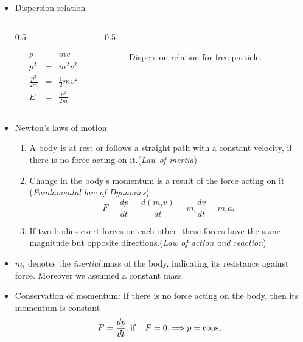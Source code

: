 \documentclass[t,aspectratio=169]{beamer}
\begin{document}
\begin{frame}
\begin{itemize}
\item Dispersion relation
\begin{columns}
\begin{column}{0.5\textwidth}
\begin{center}    
\begin{eqnarray*}
p&=&mv \\
p^{2}&=&m^{2}v^{2} \\
\frac{p^{2}}{2m}&=&\frac{1}{2}mv^{2} \\
E&=&\frac{p^{2}}{2m}
\end{eqnarray*}
\end{center}
\end{column}
\begin{column}{0.5\textwidth}
\begin{center}
\begin{figure}
\caption{Dispersion relation for free particle.}
\end{figure}
\end{center}
\end{column}
\end{columns}

\pagebreak
\item Newton's laws of motion
\begin{enumerate}
\item A body is at rest or follows a straight path with a constant velocity, if there is no force acting on it.(\emph{Law of inertia})
\item Change in the body's momentum is a result of the force acting on it (\emph{Fundamental law of Dynamics})
$$F=\frac{dp}{dt}=\frac{d(m_{i}v)}{dt}=m_{i}\frac{dv}{dt}=m_{i}a.$$
\item If two bodies exert forces on each other, these forces have the same magnitude but opposite directions.(\emph{Law of action and reaction})
\end{enumerate}
\item $m_{i}$ denotes the \emph{inertial} mass of the body, indicating its resistance against force. Moreover we assumed a constant mass.

\pagebreak

\item Conservation of momentum: If there is no force acting on the body, then its momentum is constant
$$F=\frac{dp}{dt}, \text{if}\hspace{4.0 mm}F=0, \Longrightarrow p=\text{const.}$$


\end{itemize}
\end{frame}
\end{document}
